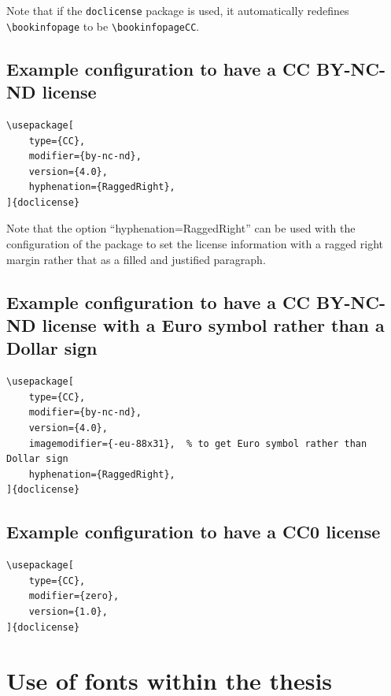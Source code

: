\documentclass[main.tex]{subfiles}
\begin{document}
Note that if the \texttt{doclicense} package is used, it automatically redefines \texttt{\textbackslash bookinfopage} to be \texttt{\textbackslash bookinfopageCC}.

\subsection{Example configuration to have a CC BY-NC-ND license}

\begin{lstlisting}[style=latexExampleForAuthors]
\usepackage[
    type={CC},
    modifier={by-nc-nd},
    version={4.0},
    hyphenation={RaggedRight},
]{doclicense}
\end{lstlisting}

Note that the option ``hyphenation={RaggedRight}'' can be used with the configuration of the package to set the license information with a ragged right margin rather that as a filled and justified paragraph.


\subsection{Example configuration to have a CC BY-NC-ND license with a Euro symbol rather than a Dollar sign}

\begin{lstlisting}[style=latexExampleForAuthors]
\usepackage[
    type={CC},
    modifier={by-nc-nd},
    version={4.0},
    imagemodifier={-eu-88x31},  % to get Euro symbol rather than Dollar sign
    hyphenation={RaggedRight},
]{doclicense}
\end{lstlisting}


\subsection{Example configuration to have a CC0 license}

\begin{lstlisting}[style=latexExampleForAuthors]
\usepackage[
    type={CC},
    modifier={zero},
    version={1.0},
]{doclicense}
\end{lstlisting}

\section{Use of fonts within the thesis}
\label{sec:useOfFontsWithinThesis}
\end{document}

